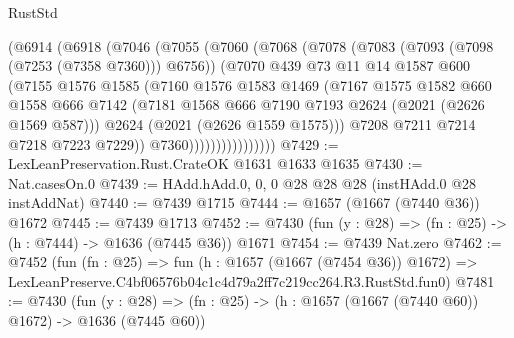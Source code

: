 \begin{lexlean}{RustStd}
\begin{coremodule}
                    (@6914
                      (@6918
                        (@7046
                          (@7055
                            (@7060
                              (@7068
                                (@7078
                                  (@7083 (@7093 (@7098 (@7253 (@7358 @7360))) @6756))
                                  (@7070
                                    @439
                                    @73
                                    @11
                                    @14
                                    @1587
                                    @600
                                    (@7155
                                      @1576
                                      @1585
                                      (@7160
                                        @1576
                                        @1583
                                        @1469
                                        (@7167
                                          @1575
                                          @1582
                                          @660
                                          @1558
                                          @666
                                          @7142
                                          (@7181
                                            @1568
                                            @666
                                            @7190
                                            @7193
                                            @2624
                                            (@2021 (@2626 @1569 @587)))
                                          @2624
                                          (@2021 (@2626 @1559 @1575)))
                                        @7208
                                        @7211
                                        @7214
                                        @7218
                                        @7223
                                        @7229))
                                    @7360))))))))))))))))
@7429 := LexLeanPreservation.Rust.CrateOK @1631 @1633 @1635
@7430 := Nat.casesOn.{0}
@7439 := HAdd.hAdd.{0, 0, 0} @28 @28 @28 (instHAdd.{0} @28 instAddNat)
@7440 := @7439 @1715
@7444 := @1657 (@1667 (@7440 @36)) @1672
@7445 := @7439 @1713
@7452 := @7430 (fun (y : @28) => (fn : @25) -> (h : @7444) -> @1636 (@7445 @36)) @1671
@7454 := @7439 Nat.zero
@7462 := @7452
    (fun (fn : @25) =>
    fun (h : @1657 (@1667 (@7454 @36)) @1672) =>
    LexLeanPreserve.C4bf06576b04c1c4d79a2ff7c219cc264.R3.RustStd.fun0)
@7481 := @7430
    (fun (y : @28) => (fn : @25) -> (h : @1657 (@1667 (@7440 @60)) @1672) -> @1636 (@7445 @60))

\end{coremodule}
\end{lexlean}
